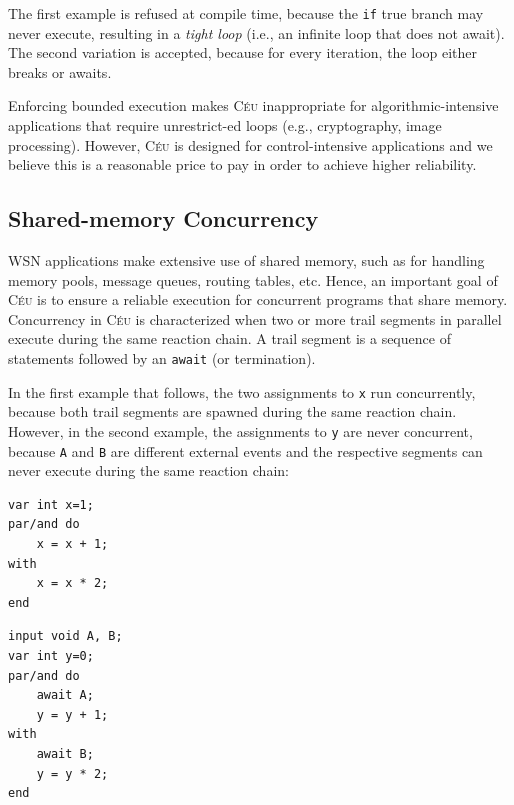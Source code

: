 \documentclass[letterpaper]{sig-alternate}
\newcommand{\code}[1] {{\small{\texttt{#1}}}}
\newcommand{\CEU}{\textsc{C\'{e}u}\xspace}
\begin{document}
The first example is refused at compile time, because the \code{if} true branch 
may never execute, resulting in a \emph{tight loop} (i.e., an infinite loop 
that does not await).
The second variation is accepted, because for every iteration, the loop either 
breaks or awaits.

Enforcing bounded execution makes \CEU inappropriate for algorithmic-intensive 
applications that require unrestrict-ed loops (e.g., cryptography, image 
processing).
However, \CEU is designed for control-intensive applications and we believe 
this is a reasonable price to pay in order to achieve higher reliability.


\newpage %

\subsection{Shared-memory Concurrency}
\label{sec.ceu.shared}

WSN applications make extensive use of shared memory, such as for handling 
memory pools, message queues, routing tables, etc.
Hence, an important goal of \CEU is to ensure a reliable execution for 
concurrent programs that share memory.
%
Concurrency in \CEU is characterized when two or more trail segments in 
parallel execute during the same reaction chain.
A trail segment is a sequence of statements followed by an \code{await} (or 
termination).

In the first example that follows, the two assignments to \code{x} run 
concurrently, because both trail segments are spawned during the same reaction 
chain.
However, in the second example, the assignments to \code{y} are never 
concurrent, because \code{A} and \code{B} are different external events and the 
respective segments can never execute during the same reaction chain:

\nopagebreak
\noindent
\begin{minipage}[t]{0.45\linewidth}
\begin{lstlisting}
var int x=1;
par/and do
    x = x + 1;
with
    x = x * 2;
end
\end{lstlisting}
\end{minipage}
%
\begin{minipage}[t]{0.45\linewidth}
\begin{lstlisting}
input void A, B;
var int y=0;
par/and do
    await A;
    y = y + 1;
with
    await B;
    y = y * 2;
end
\end{lstlisting}
\end{minipage}
\end{document}
